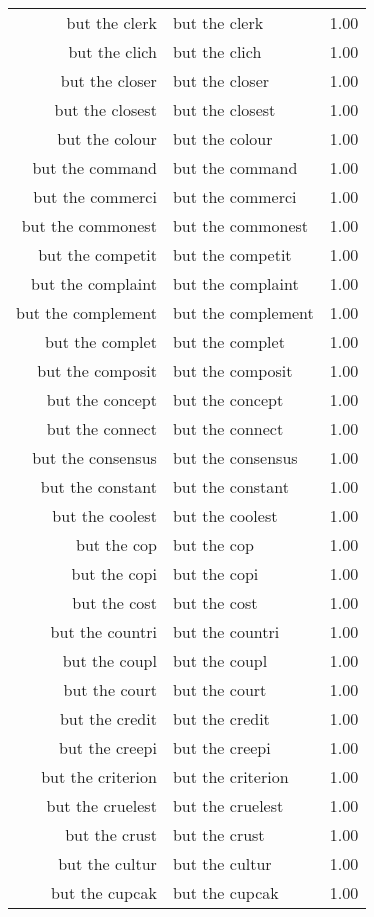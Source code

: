 \begin{table}[ht]
\begin{tabular}{rlr}
  but the clerk & but the clerk & 1.00 \\ 
  but the clich & but the clich & 1.00 \\ 
  but the closer & but the closer & 1.00 \\ 
  but the closest & but the closest & 1.00 \\ 
  but the colour & but the colour & 1.00 \\ 
  but the command & but the command & 1.00 \\ 
  but the commerci & but the commerci & 1.00 \\ 
  but the commonest & but the commonest & 1.00 \\ 
  but the competit & but the competit & 1.00 \\ 
  but the complaint & but the complaint & 1.00 \\ 
  but the complement & but the complement & 1.00 \\ 
  but the complet & but the complet & 1.00 \\ 
  but the composit & but the composit & 1.00 \\ 
  but the concept & but the concept & 1.00 \\ 
  but the connect & but the connect & 1.00 \\ 
  but the consensus & but the consensus & 1.00 \\ 
  but the constant & but the constant & 1.00 \\ 
  but the coolest & but the coolest & 1.00 \\ 
  but the cop & but the cop & 1.00 \\ 
  but the copi & but the copi & 1.00 \\ 
  but the cost & but the cost & 1.00 \\ 
  but the countri & but the countri & 1.00 \\ 
  but the coupl & but the coupl & 1.00 \\ 
  but the court & but the court & 1.00 \\ 
  but the credit & but the credit & 1.00 \\ 
  but the creepi & but the creepi & 1.00 \\ 
  but the criterion & but the criterion & 1.00 \\ 
  but the cruelest & but the cruelest & 1.00 \\ 
  but the crust & but the crust & 1.00 \\ 
  but the cultur & but the cultur & 1.00 \\ 
  but the cupcak & but the cupcak & 1.00 \\ 

\end{tabular}
\end{table}
